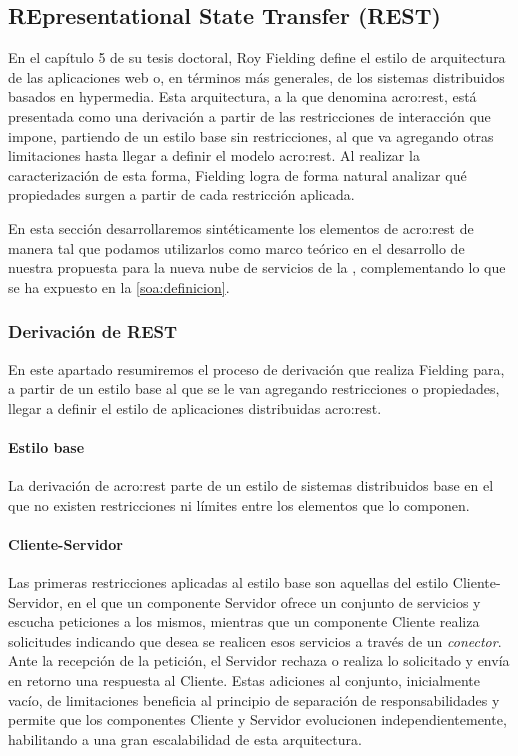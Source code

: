 \subsection{REpresentational State Transfer (REST)}
\label{standard:rest}

En el capítulo 5 de su tesis doctoral, Roy Fielding define el estilo de arquitectura de las aplicaciones web o, en términos más generales, de los sistemas distribuidos basados en hypermedia. Esta arquitectura, a la que denomina \gls{acro:rest}, está presentada como una derivación a partir de las restricciones de interacción que impone, partiendo de un estilo base sin restricciones, al que va agregando otras limitaciones hasta llegar a definir el modelo \gls{acro:rest}. Al realizar la caracterización de esta forma, Fielding logra de forma natural analizar qué propiedades surgen a partir de cada restricción aplicada.

En esta sección desarrollaremos sintéticamente los elementos de \gls{acro:rest} de manera tal que podamos utilizarlos como marco teórico en el desarrollo de nuestra propuesta para la nueva nube de servicios de la {\unlp}, complementando lo que se ha expuesto en la \autoref{soa:definicion}.


\subsubsection{Derivación de REST}
\label{standard:rest:derivacion}

En este apartado resumiremos el proceso de derivación que realiza Fielding para, a partir de un estilo base al que se le van agregando restricciones o propiedades, llegar a definir el estilo de aplicaciones distribuidas \gls{acro:rest}.

\paragraph{Estilo base}

La derivación de \gls{acro:rest} parte de un estilo de sistemas distribuidos base en el que no existen restricciones ni límites entre los elementos que lo componen.


\paragraph{Cliente-Servidor}

Las primeras restricciones aplicadas al estilo base son aquellas del estilo Cliente-Servidor\cite[Sec.~3.4.1]{tesis:fielding}, en el que un componente Servidor ofrece un conjunto de servicios y escucha peticiones a los mismos, mientras que un componente Cliente realiza solicitudes indicando que desea se realicen esos servicios a través de un \textit{conector}. Ante la recepción de la petición, el Servidor rechaza o realiza lo solicitado y envía en retorno una respuesta al Cliente.
Estas adiciones al conjunto, inicialmente vacío, de limitaciones beneficia al principio de separación de responsabilidades y permite que los componentes Cliente y Servidor evolucionen independientemente, habilitando a una gran escalabilidad de esta arquitectura.


